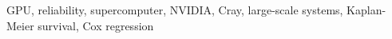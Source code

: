 \documentclass[conference]{IEEEtran}
\newcommand{\doubleblind}[2]{#2} %
\begin{document}
\maketitle

\begin{abstract}

\end{abstract}

\begin{IEEEkeywords}
GPU, reliability, supercomputer, NVIDIA, Cray, large-scale systems,
Kaplan-Meier survival, Cox regression
\end{IEEEkeywords}
















\doubleblind{}{}




\end{document}
